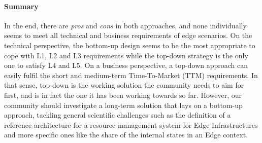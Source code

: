 \paragraph{Summary}
In the end, there are \emph{pros} and \emph{cons} in both approaches,
and none individually seems to meet all technical and business
requirements of edge scenarios.
On the technical perspective, the bottom-up
design seems to be the most appropriate to cope with L1, L2 and L3
requirements while the top-down strategy is the only one to satisfy L4
and L5.
%
On a business perspective, a top-down approach can easily fulfil the
short and medium-term Time-To-Market (TTM) requirements. In that
sense, top-down is the working solution the community needs to aim for
first, and is in fact the one it has been working towards so
far. However, our community should investigate a long-term solution
that lays on a bottom-up approach, tackling general scientific
challenges such as the definition of a reference architecture for a
resource management system for Edge Infrastructures and more specific ones
like the share of the internal states in an Edge context.










